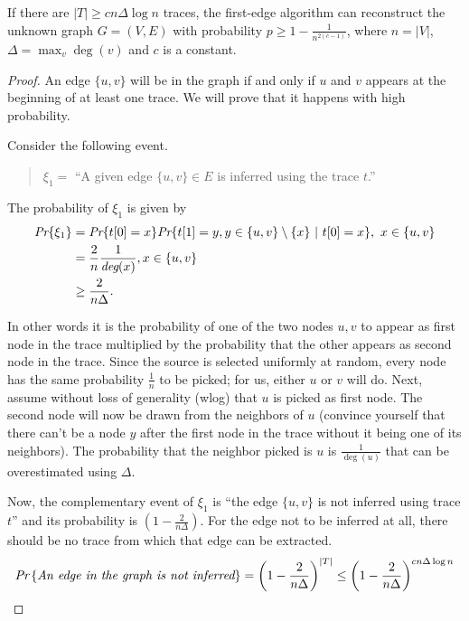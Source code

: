 \begin{thm}
 	 If there are $|T| \geq cn\Delta\log n$ traces, the first-edge algorithm can reconstruct the unknown graph $G=(V, E)$ with probability $p \geq 1 - \frac{1}{n^{2(c-1)}}$, where $n = |V|$, $\Delta = \max_v \deg(v)$ and $c$ is a constant.
 \end{thm}
\begin{proof}
	An edge $\{u, v\}$ will be in the graph if and only if $u$ and $v$ appears at the beginning of at least one trace. We will prove that it happens with high probability.
	
	Consider the following event.
	\begin{quotation}
		$\xi_1 =$ ``A given edge $\{u, v\} \in E$ is inferred using the trace $t$.''
	\end{quotation}
	
	The probability of $\xi_1$ is given by
	\begin{align}
	\emph{Pr}\{\xi_1\} &= \emph{Pr}\{t[0] = x\}\emph{Pr}\{t[1] = y, y\in \{u, v\}\setminus\{x\}\ |\ t[0] = x\},\  x\in \{u, v\}\\
	&= \frac{2}{n}\frac{1}{\deg(x)}, x \in \{u, v\}\\
	&\geq \frac{2}{n\Delta}.
	\end{align}
	
	In other words it is the probability of one of the two nodes $u, v$ to appear as first node in the trace multiplied by the probability that the other appears as second node in the trace. Since the source is selected uniformly at random, every node has the same probability $\frac{1}{n}$ to be picked; for us, either $u$ or $v$ will do. Next, assume without loss of generality (wlog) that $u$ is picked as first node. The second node will now be drawn from the neighbors of $u$ (convince yourself that there can't be a node $y$ after the first node in the trace without it being one of its neighbors). The probability that the neighbor picked is $u$ is $\frac{1}{\deg(u)}$ that can be overestimated using $\Delta$.
	
	Now, the complementary event of $\xi_1$ is ``the edge $\{u,v\}$ is not inferred using trace $t$'' and its probability is $(1 - \frac{2}{n\Delta})$. For the edge not to be inferred at all, there should be no trace from which that edge can be extracted.
	\begin{equation}
	\pr{\emph{An edge in the graph is not inferred}} = \left(1- \frac{2}{n\Delta}\right)^{|T|} \leq \left(1- \frac{2}{n\Delta}\right)^{cn\Delta\log n} 
	\end{equation}
	

\end{proof}

